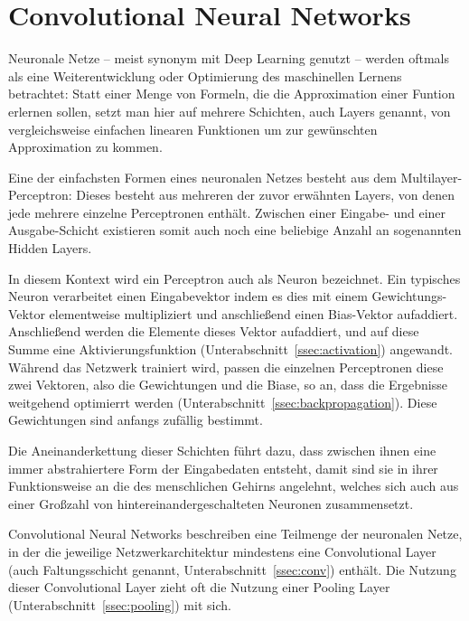\section{Convolutional Neural Networks}	%
\label{sec:cnn}

Neuronale Netze -- meist synonym mit Deep Learning genutzt -- werden oftmals als eine Weiterentwicklung oder Optimierung des maschinellen Lernens betrachtet: Statt einer Menge von Formeln, die die Approximation einer Funtion erlernen sollen, setzt man hier auf mehrere Schichten, auch Layers genannt, von vergleichsweise einfachen linearen Funktionen um zur gewünschten Approximation zu kommen. \cite{hardesty_17}

Eine der einfachsten Formen eines neuronalen Netzes besteht aus dem Multilayer-Perceptron: Dieses besteht aus mehreren der zuvor erwähnten Layers, von denen jede mehrere einzelne Perceptronen enthält. Zwischen einer Eingabe- und einer Ausgabe-Schicht existieren somit auch noch eine beliebige Anzahl an sogenannten Hidden Layers.

In diesem Kontext wird ein Perceptron auch als Neuron bezeichnet. Ein typisches Neuron verarbeitet einen Eingabevektor indem es dies mit einem Gewichtungs-Vektor elementweise multipliziert und anschließend einen Bias-Vektor aufaddiert. Anschließend werden die Elemente dieses Vektor aufaddiert, und auf diese Summe eine Aktivierungsfunktion (\vgl Unterabschnitt~\ref{ssec:activation}) angewandt. Während das Netzwerk trainiert wird, passen die einzelnen Perceptronen diese zwei Vektoren, also die Gewichtungen und die Biase, so an, dass die Ergebnisse weitgehend optimierrt werden (\vgl Unterabschnitt~\ref{ssec:backpropagation}). Diese Gewichtungen sind anfangs zufällig bestimmt. \cite{hardesty_17, cs231n} 

Die Aneinanderkettung dieser Schichten führt dazu, dass zwischen ihnen eine immer abstrahiertere Form der Eingabedaten entsteht, damit sind sie in ihrer Funktionsweise an die des menschlichen Gehirns angelehnt, welches sich auch aus einer Großzahl von hintereinandergeschalteten Neuronen zusammensetzt. %

Convolutional Neural Networks beschreiben eine Teilmenge der neuronalen Netze, in der die jeweilige Netzwerkarchitektur mindestens eine Convolutional Layer (auch Faltungsschicht genannt, \vgl Unterabschnitt~\ref{ssec:conv}) enthält. Die Nutzung dieser Convolutional Layer zieht oft die Nutzung einer Pooling Layer (Unterabschnitt~\ref{ssec:pooling}) mit sich. \cite{deeplearning_16}

